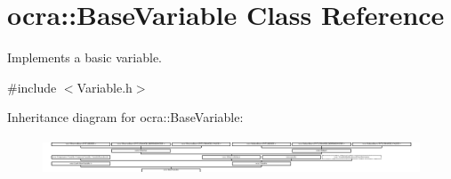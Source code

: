 \hypertarget{classocra_1_1BaseVariable}{}\section{ocra\+:\+:Base\+Variable Class Reference}
\label{classocra_1_1BaseVariable}


Implements a basic variable.  




{\ttfamily \#include $<$Variable.\+h$>$}

Inheritance diagram for ocra\+:\+:Base\+Variable\+:\begin{figure}[H]
\begin{center}
\leavevmode
\includegraphics[height=1.100629cm]{d5/d40/classocra_1_1BaseVariable}
\end{center}
\end{figure}
